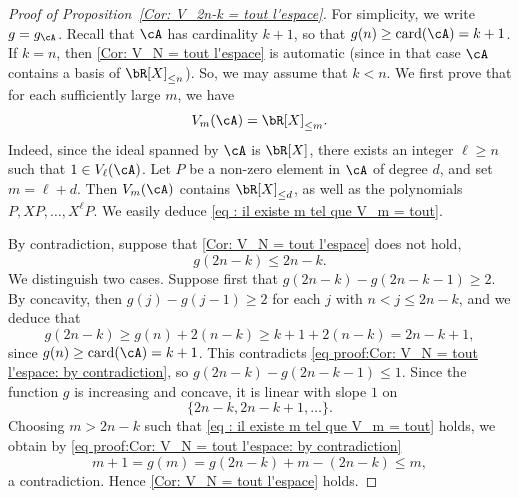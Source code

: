 \begin{proof}[Proof of Proposition~\ref{Cor: V_2n-k = tout l'espace}]
For simplicity, we write $g=g_\cA$. Recall that $\cA$ has cardinality $k+1$, so that $g(n)\geq \textrm{card}(\cA) = k+1$. If $k=n$, then \eqref{Cor: V_N = tout l'espace} is automatic (since in that case $\cA$ contains a basis of $\bR[X]_{\leq n}$). So, we may assume that $k< n$. We first prove that for each sufficiently large $m$, we have
\begin{equation}
\label{eq : il existe m tel que V_m = tout}
V_{m}(\cA) = \bR[X]_{\leq m}.
\end{equation}
Indeed, since the ideal spanned by $\cA$ is $\bR[X]$, there exists an integer $\ell\geq n$ such that $1\in V_\ell(\cA)$. Let $P$ be a non-zero element in $\cA$ of degree $d$, and set $m=\ell+d$. Then $V_{m}(\cA)$ contains $\bR[X]_{\leq d}$, as well as the polynomials $P,XP,\ldots,X^\ell P$. We easily deduce \eqref{eq : il existe m tel que V_m = tout}.

By contradiction, suppose that \eqref{Cor: V_N = tout l'espace} does not hold, \ie
\begin{equation}
\label{eq proof:Cor: V_N = tout l'espace: by contradiction}
g(2n-k) \leq 2n-k.
\end{equation}
We distinguish two cases. Suppose first that $g(2n-k)-g(2n-k-1) \geq 2$. By concavity, then $g(j)-g(j-1)\geq 2$ for each $j$ with $n < j \leq 2n-k$, and we deduce that
\begin{equation*}
g(2n-k) \geq g(n)+2(n-k) \geq k+1 + 2(n-k) = 2n-k+1,
\end{equation*}
since $g(n) \geq \textrm{card}(\cA) = k+1$. This contradicts \eqref{eq proof:Cor: V_N = tout l'espace: by contradiction}, so $g(2n-k)-g(2n-k-1) \leq 1$. Since the function $g$ is increasing and concave, it is linear with slope $1$ on
\[
\{2n-k,2n-k+1,\dots\}.
\]
Choosing $m > 2n-k$ such that \eqref{eq : il existe m tel que V_m = tout} holds, we obtain by \eqref{eq proof:Cor: V_N = tout l'espace: by contradiction}
\begin{equation*}
m+1 = g(m) = g(2n-k)+ m - (2n-k) \leq m,
\end{equation*}
a contradiction. Hence \eqref{Cor: V_N = tout l'espace} holds.
\end{proof}

